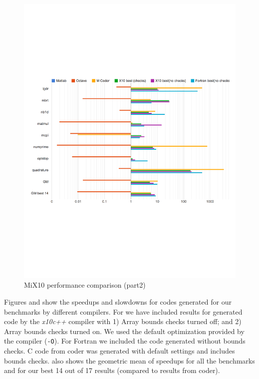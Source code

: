\begin{figure}[htbp] \begin{center}
\includegraphics[width=\linewidth]{Figures/final/graph_1_1_2.pdf} \caption
{MiX10 performance comparison (part2) }\label{Fig:graph1_1_2} \end{center}
\end{figure} 

Figures  and  show the speedups
and slowdowns for codes generated for our benchmarks by different compilers.
For \mixten we have included results for generated \xten code by the
\emph{x10c++} compiler with 1) Array bounds checks turned off; and 2) Array
bounds checks turned on. We used the default optimization provided by the \xten
compiler (\texttt{-O}). For Fortran we included the code generated without
bounds checks. C code from \matlab coder was generated with default settings and
includes bounds checks.  also shows the geometric mean of
speedups for all the benchmarks and for our best 14 out of 17 results (compared
to results from \matlab coder). 

